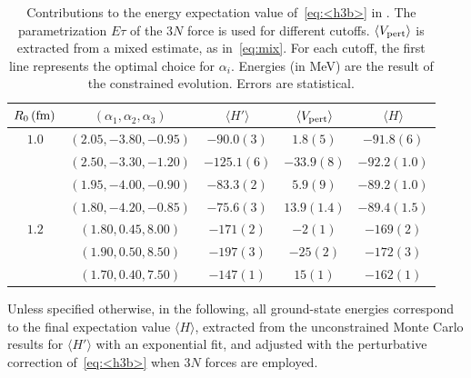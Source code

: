 \documentclass[aps,prc,twocolumn,superscriptaddress,floatfix]{revtex4-1}
\begin{document}
\setlength{\tabcolsep}{1.5pt}
\begin{table}[htb]
\centering
\caption[]{Contributions to the energy expectation value of~\cref{eq:<h3b>} in .
The parametrization $E\tau$ of the $3N$ force is used for different cutoffs.
$\langle V_{\rm pert}\rangle$ is extracted from a mixed estimate, as in~\cref{eq:mix}.
For each cutoff, the first line represents the optimal choice for $\alpha_i$.
Energies (in MeV) are the result of the constrained evolution.
Errors are statistical.}
\begin{tabular}{ccccc}
\hline\hline
$R_0\,(\rm fm)$ & $(\alpha_1,\alpha_2,\alpha_3)$ & $\langle H'\rangle$ & $\langle V_{\rm pert}\rangle$ & $\langle H\rangle$ \\
\hline
$1.0$ & $(2.05,-3.80,-0.95)$ & $-90.0(3)$  & $1.8(5)$    & $-91.8(6)$   \\
      & $(2.50,-3.30,-1.20)$ & $-125.1(6)$ & $-33.9(8)$  & $-92.2(1.0)$ \\
      & $(1.95,-4.00,-0.90)$ & $-83.3(2)$  & $5.9(9)$    & $-89.2(1.0)$ \\
      & $(1.80,-4.20,-0.85)$ & $-75.6(3)$  & $13.9(1.4)$ & $-89.4(1.5)$ \\
\hline                        
$1.2$ & $(1.80,0.45,8.00)$   & $-171(2)$   & $-2(1)$     & $-169(2)$    \\
      & $(1.90,0.50,8.50)$   & $-197(3)$   & $-25(2)$    & $-172(3)$    \\
      & $(1.70,0.40,7.50)$   & $-147(1)$   & $15(1)$     & $-162(1)$    \\
\hline\hline
\end{tabular}
\label{tab:alpha}
\end{table}
\setlength{\tabcolsep}{10pt}

Unless specified otherwise, in the following, all ground-state energies  
correspond to the final expectation value $\langle H\rangle$, extracted from 
the unconstrained Monte Carlo results for $\langle H'\rangle$ with an exponential fit, 
and adjusted with the perturbative correction of~\cref{eq:<h3b>} when $3N$ forces are employed.
\end{document}
